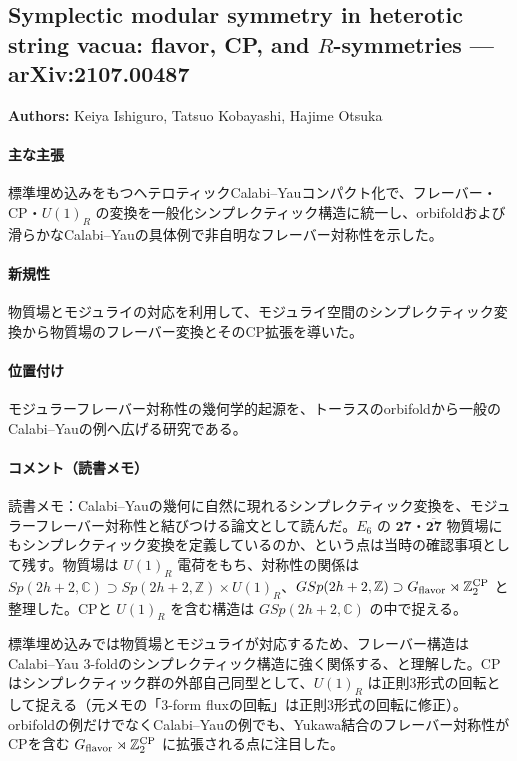 \subsection{Symplectic modular symmetry in heterotic string vacua: flavor, CP, and $R$-symmetries --- arXiv:2107.00487}

\textbf{Authors:} Keiya Ishiguro, Tatsuo Kobayashi, Hajime Otsuka

\paragraph{主な主張}
標準埋め込みをもつヘテロティックCalabi--Yauコンパクト化で、フレーバー・CP・$U(1)_R$ の変換を一般化シンプレクティック構造に統一し、orbifoldおよび滑らかなCalabi--Yauの具体例で非自明なフレーバー対称性を示した\cite{Ishiguro:2021ccl}。

\paragraph{新規性}
物質場とモジュライの対応を利用して、モジュライ空間のシンプレクティック変換から物質場のフレーバー変換とそのCP拡張を導いた。

\paragraph{位置付け}
モジュラーフレーバー対称性の幾何学的起源を、トーラスのorbifoldから一般のCalabi--Yauの例へ広げる研究である。

\paragraph{コメント（読書メモ）}
読書メモ：Calabi--Yauの幾何に自然に現れるシンプレクティック変換を、モジュラーフレーバー対称性と結びつける論文として読んだ。$E_6$ の $\mathbf{27}$・$\overline{\mathbf{27}}$ 物質場にもシンプレクティック変換を定義しているのか、という点は当時の確認事項として残す。物質場は $U(1)_R$ 電荷をもち、対称性の関係は $Sp(2h+2,\mathbb{C})\supset Sp(2h+2,\mathbb{Z})\times U(1)_R$、$GSp(2h+2,\mathbb{Z})\supset G_{\rm flavor}\rtimes\mathbb{Z}_2^{\rm CP}$ と整理した。CPと $U(1)_R$ を含む構造は $GSp(2h+2,\mathbb{C})$ の中で捉える。\par
標準埋め込みでは物質場とモジュライが対応するため、フレーバー構造はCalabi--Yau 3-foldのシンプレクティック構造に強く関係する、と理解した。CPはシンプレクティック群の外部自己同型として、$U(1)_R$ は正則3形式の回転として捉える（元メモの「3-form fluxの回転」は正則3形式の回転に修正）。orbifoldの例だけでなくCalabi--Yauの例でも、Yukawa結合のフレーバー対称性がCPを含む $G_{\rm flavor}\rtimes\mathbb{Z}_2^{\rm CP}$ に拡張される点に注目した。
